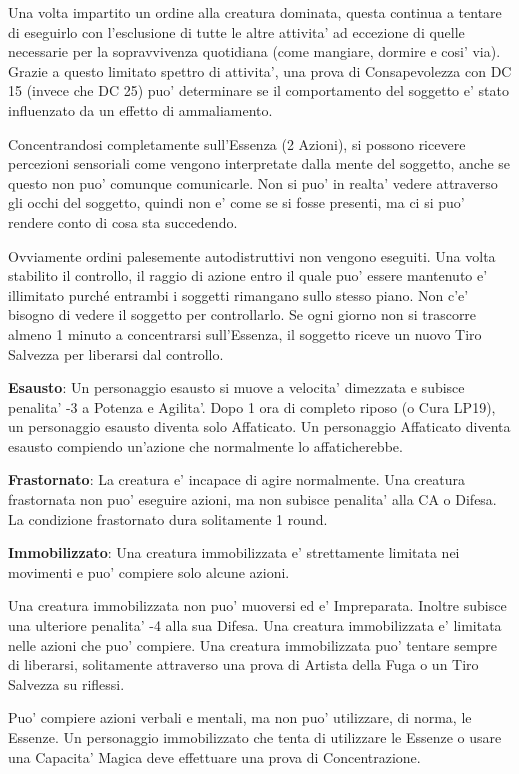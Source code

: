 \documentclass[a4paper,11pt,twoside,openany]{book}
\begin{document}
{Una volta impartito un ordine alla creatura dominata, questa continua a tentare di eseguirlo con l'esclusione di tutte le altre attivita' ad eccezione di quelle necessarie per la sopravvivenza quotidiana (come mangiare, dormire e cosi' via). Grazie a questo limitato spettro di attivita', una prova di Consapevolezza con DC 15 (invece che DC 25) puo' determinare se il comportamento del soggetto e' stato influenzato da un effetto di ammaliamento.

Concentrandosi completamente sull'Essenza (2 Azioni), si possono ricevere percezioni sensoriali come vengono interpretate dalla mente del soggetto, anche se questo non puo' comunque comunicarle. Non si puo' in realta' vedere attraverso gli occhi del soggetto, quindi non e' come se si fosse presenti, ma ci si puo' rendere conto di cosa sta succedendo. 

Ovviamente ordini palesemente autodistruttivi non vengono eseguiti. Una volta stabilito il controllo, il raggio di azione entro il quale puo' essere mantenuto e' illimitato purché entrambi i soggetti rimangano sullo stesso piano. Non c'e' bisogno di vedere il soggetto per controllarlo. Se ogni giorno non si trascorre almeno 1 minuto a concentrarsi sull'Essenza, il soggetto riceve un nuovo Tiro Salvezza per liberarsi dal controllo.

\textbf{Esausto}: Un personaggio esausto si muove a velocita' dimezzata e subisce penalita' -3 a Potenza e Agilita'. Dopo 1 ora di completo riposo (o Cura LP19), un personaggio esausto diventa solo Affaticato. Un personaggio Affaticato diventa esausto compiendo un'azione che normalmente lo affaticherebbe.

\textbf{Frastornato}: La creatura e' incapace di agire normalmente.
Una creatura frastornata non puo' eseguire azioni, ma non subisce penalita' alla CA o Difesa. La condizione frastornato dura solitamente 1 round.

\textbf{Immobilizzato}: Una creatura immobilizzata e' strettamente limitata nei movimenti e puo' compiere solo alcune azioni.

Una creatura immobilizzata non puo' muoversi ed e' Impreparata. Inoltre subisce una ulteriore penalita' -4 alla sua Difesa. Una creatura immobilizzata e' limitata nelle azioni che puo' compiere. Una creatura immobilizzata puo' tentare sempre di liberarsi, solitamente attraverso una prova di Artista della Fuga o un Tiro Salvezza su riflessi.

Puo' compiere azioni verbali e mentali, ma non puo' utilizzare, di norma, le Essenze. Un personaggio immobilizzato che tenta di utilizzare le Essenze o usare una Capacita' Magica deve effettuare una prova di Concentrazione. 

}
\end{document}
